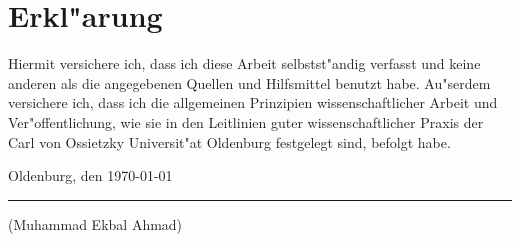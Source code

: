 	\section*{Erkl"arung}
	Hiermit versichere ich, dass ich diese Arbeit selbstst"andig verfasst und keine anderen als die angegebenen Quellen und Hilfsmittel benutzt habe. Au"serdem versichere ich, dass ich die allgemeinen Prinzipien wissenschaftlicher Arbeit und Ver"offentlichung, wie sie in den Leitlinien guter wissenschaftlicher Praxis der Carl von Ossietzky Universit"at Oldenburg festgelegt sind, befolgt habe.
	
	\vspace{1cm}
	Oldenburg, den \today
	
	\vspace{0.5cm}
	\rule{6cm}{0.5pt}
	
	(Muhammad Ekbal Ahmad)

